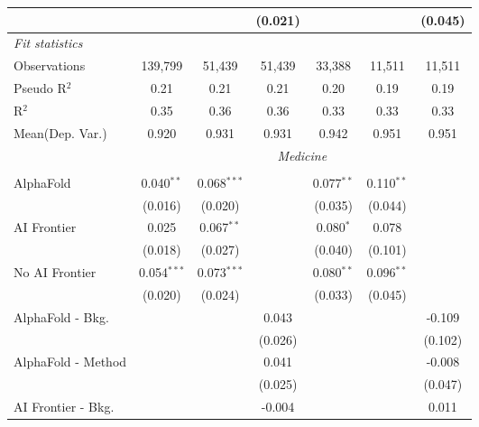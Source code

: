 \begin{tabular}{lcccccc}
                           &              &               & (0.021)       &              &         & (0.045)\\   
   \midrule
   \emph{Fit statistics}\\
   Observations            & 139,799      & 51,439        & 51,439        & 33,388       & 11,511  & 11,511\\  
   Pseudo R$^2$            & 0.21         & 0.21          & 0.21          & 0.20         & 0.19    & 0.19\\  
   R$^2$                   & 0.35         & 0.36          & 0.36          & 0.33         & 0.33    & 0.33\\  
   
Mean(Dep. Var.) & 0.920 & 0.931 & 0.931 & 0.942 & 0.951 & 0.951 \\
 & \multicolumn{6}{c}{\textit{Medicine}} \\ \\
   AlphaFold               & 0.040$^{**}$  & 0.068$^{***}$ &               & 0.077$^{**}$ & 0.110$^{**}$ &   \\   
                           & (0.016)       & (0.020)       &               & (0.035)      & (0.044)      &   \\   
   AI Frontier             & 0.025         & 0.067$^{**}$  &               & 0.080$^{*}$  & 0.078        &   \\   
                           & (0.018)       & (0.027)       &               & (0.040)      & (0.101)      &   \\   
   No AI Frontier          & 0.054$^{***}$ & 0.073$^{***}$ &               & 0.080$^{**}$ & 0.096$^{**}$ &   \\   
                           & (0.020)       & (0.024)       &               & (0.033)      & (0.045)      &   \\   
   AlphaFold - Bkg.        &               &               & 0.043         &              &              & -0.109\\   
                           &               &               & (0.026)       &              &              & (0.102)\\   
   AlphaFold - Method      &               &               & 0.041         &              &              & -0.008\\   
                           &               &               & (0.025)       &              &              & (0.047)\\   
   AI Frontier - Bkg.      &               &               & -0.004        &              &              & 0.011\\   

\end{tabular}
